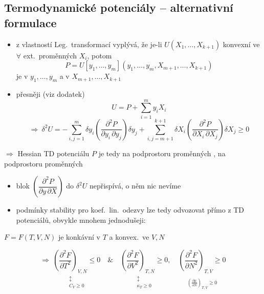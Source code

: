 \subsection{Termodynamické potenciály -- alternativní formulace}
\begin{itemize}
  \item z vlastností Leg.\ transformací vyplývá, že je-li $U(X_1,\dots,X_{k+1})$ konvexní ve $\forall$ ext.\ proměnných $X_i$, potom
  \[ P = U[y_1,\dots,y_m](y_1,\dots,y_m,X_{m+1},\dots,X_{k+1}) \]
  je  v $y_1,\dots,y_m$ a  v $X_{m+1},\dots,X_{k+1}$
  \item přesněji (viz dodatek)
  \[
    U = P + \sum_{i=1}^{m}y_iX_i
  \]
  \[
    \Rightarrow\ \delta^2U = -\sum_{i,j=1}^{m}\delta y_i\left(\frac{\partial^2P}{\partial y_i\,\partial y_j}\right)\delta y_j
    + \sum_{i,j=m+1}^{k+1}\delta X_i\left(\frac{\partial^2P}{\partial X_i\,\partial X_j}\right)\delta X_j \geq 0
  \]
\end{itemize}

\begin{veta}
$\Rightarrow$ Hessian TD potenciálu $P$ je tedy na podprostoru  proměnných , na podprostoru  proměnných 
\end{veta}
\begin{itemize}
  \item {} blok $\left(\dfrac{\partial^2P}{\partial y\,\partial X}\right)$ do $\delta^2U$ nepřispívá, o něm nic nevíme
  \item podmínky stability pro koef.\ lin.\ odezvy lze tedy odvozovat přímo z TD potenciálů, obvykle mnohem jednodušeji:
\end{itemize}

\begin{priklad}[Př:]
$F = F(T,V,N)$ je konkávní v $T$ a konvex.\ ve $V, N$

\begin{minipage}{0.3\textwidth}
\end{minipage}
\begin{minipage}{0.68\textwidth}
\[
  \Rightarrow\
  \underset{\substack{\updownarrow\\ C_V\geq0}}{\left(\frac{\partial^2F}{\partial T^2}\right)_{V,N} \leq 0}
  \quad\&\quad
  \underset{\substack{\updownarrow\\ \kappa_T\geq0}}{\left(\frac{\partial^2F}{\partial V^2}\right)_{T,N} \geq 0},\quad
  \underset{\substack{\\ \left(\frac{\partial\mu}{\partial N}\right)_{T,V}\geq0}}{\left(\frac{\partial^2F}{\partial N^2}\right)_{T,V} \geq 0}
\]
\end{minipage}
\end{priklad}

